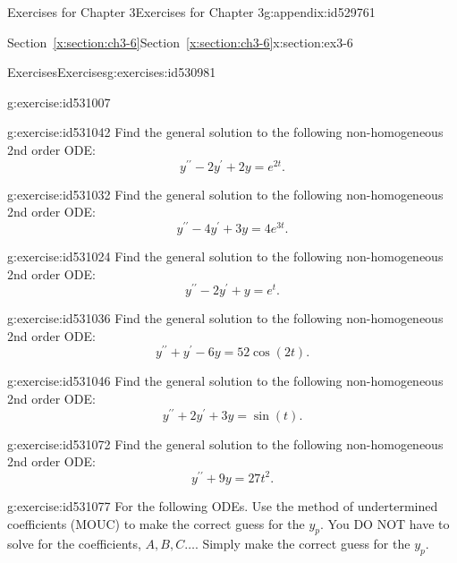 \documentclass[oneside,10pt,]{book}
\newcommand{\xreffont}{\relax}
\numberwithin{equation}{section}
\numberwithin{equation}{section}
\begin{document}
\begin{appendixptx}{Exercises for Chapter 3}{}{Exercises for Chapter 3}{}{}{g:appendix:id529761}
\begin{sectionptx}{Section~{\xreffont\ref*{x:section:ch3-6}}}{}{Section~{\xreffont\ref*{x:section:ch3-6}}}{}{}{x:section:ex3-6}
\begin{exercises-subsection-numberless}{Exercises}{}{Exercises}{}{}{g:exercises:id530981}
\begin{divisionexercise}{1}{}{}{g:exercise:id531007}
\begin{enumerate}[label=(\alph*)]
%
\end{enumerate}
\end{divisionexercise}%
\begin{divisionexercise}{2}{}{}{g:exercise:id531042}%
Find the general solution to the following non-homogeneous 2nd order ODE:%
%
\begin{equation*}
y^{\prime\prime}-2y^{\prime}+2y=e^{2t}.
\end{equation*}
\end{divisionexercise}%
\begin{divisionexercise}{3}{}{}{g:exercise:id531032}%
Find the general solution to the following non-homogeneous 2nd order ODE:%
\begin{equation*}
y^{\prime\prime}-4y^{\prime}+3y=4e^{3t}.
\end{equation*}
%
\end{divisionexercise}%
\begin{divisionexercise}{4}{}{}{g:exercise:id531024}%
Find the general solution to the following non-homogeneous 2nd order ODE:%
\begin{equation*}
y^{\prime\prime}-2y^{\prime}+y=e^{t}.
\end{equation*}
%
\end{divisionexercise}%
\begin{divisionexercise}{5}{}{}{g:exercise:id531036}%
Find the general solution to the following non-homogeneous 2nd order ODE:%
\begin{equation*}
y^{\prime\prime}+y^{\prime}-6y=52\cos\left(2t\right).
\end{equation*}
%
\end{divisionexercise}%
\begin{divisionexercise}{6}{}{}{g:exercise:id531046}%
Find the general solution to the following non-homogeneous 2nd order ODE:%
\begin{equation*}
y^{\prime\prime}+2y^{\prime}+3y=\sin\left(t\right).
\end{equation*}
%
\end{divisionexercise}%
\begin{divisionexercise}{7}{}{}{g:exercise:id531072}%
Find the general solution to the following non-homogeneous 2nd order ODE:%
\begin{equation*}
y^{\prime\prime}+9y=27t^2.
\end{equation*}
%
\end{divisionexercise}%
\begin{divisionexercise}{8}{}{}{g:exercise:id531077}%
For the following ODEs. Use the method of undertermined coefficients (MOUC) to make the correct guess for the \(y_{p}\). You DO NOT have to solve for the coefficients, \(A,B,C\dots\). Simply make the correct guess for the \(y_{p}\).%

\end{divisionexercise}
\end{exercises-subsection-numberless}
\end{sectionptx}
\end{appendixptx}
\end{document}

